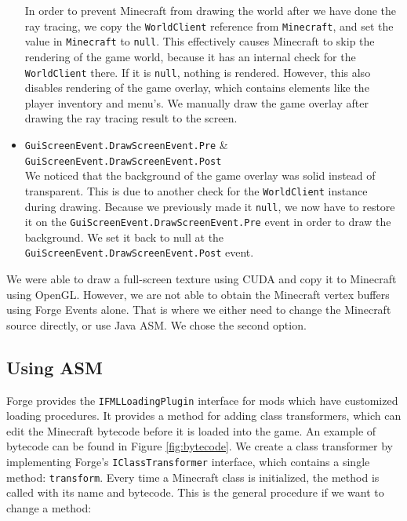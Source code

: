 \documentclass[]{article}
\begin{document}
\begin{itemize}
    In order to prevent Minecraft from drawing the world after we have done the ray tracing, we copy the \texttt{WorldClient} reference from \texttt{Minecraft}, and set the value in \texttt{Minecraft} to \texttt{null}.
    This effectively causes Minecraft to skip the rendering of the game world, because it has an internal check for the \texttt{WorldClient} there.
    If it is \texttt{null}, nothing is rendered.
    However, this also disables rendering of the game overlay, which contains elements like the player inventory and menu's.
    We manually draw the game overlay after drawing the ray tracing result to the screen.
  \item \texttt{GuiScreenEvent.DrawScreenEvent.Pre} \& \texttt{GuiScreenEvent.DrawScreenEvent.Post} \\
    We noticed that the background of the game overlay was solid instead of transparent.
    This is due to another check for the \texttt{WorldClient} instance during drawing.
    Because we previously made it \texttt{null}, we now have to restore it on the \texttt{GuiScreenEvent.DrawScreenEvent.Pre} event in order to draw the background.
    We set it back to null at the \texttt{GuiScreenEvent.DrawScreenEvent.Post} event.
\end{itemize}
We were able to draw a full-screen texture using CUDA and copy it to Minecraft using OpenGL.
However, we are not able to obtain the Minecraft vertex buffers using Forge Events alone.
That is where we either need to change the Minecraft source directly, or use Java ASM.
We chose the second option.

\subsection{Using ASM}
Forge provides the \texttt{IFMLLoadingPlugin} interface for mods which have customized loading procedures.
It provides a method for adding class transformers, which can edit the Minecraft bytecode before it is loaded into the game.
An example of bytecode can be found in Figure \ref{fig:bytecode}.
We create a class transformer by implementing Forge's \texttt{IClassTransformer} interface, which contains a single method: \texttt{transform}.
Every time a Minecraft class is initialized, the method is called with its name and bytecode.
This is the general procedure if we want to change a method:
\end{document}
